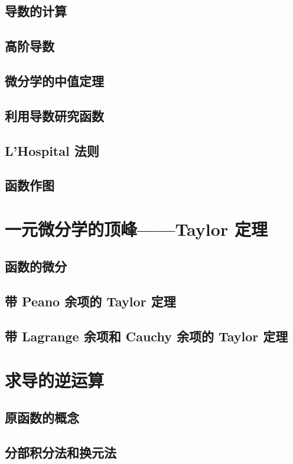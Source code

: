 \documentclass[a4paper, 11pt]{ctexbook}
\begin{document}
            \section{导数的计算}
            \section{高阶导数}
            \section{微分学的中值定理}
            \section{利用导数研究函数}
            \section{L'Hospital 法则}
            \section{函数作图}
        \chapter{一元微分学的顶峰——Taylor 定理}
            \section{函数的微分}
                
            \section{带 Peano 余项的 Taylor 定理}
                
            \section{带 Lagrange 余项和 Cauchy 余项的 Taylor 定理}
        \chapter{求导的逆运算}
            \section{原函数的概念}
                
            \section{分部积分法和换元法}
\end{document}
